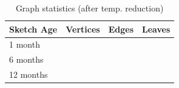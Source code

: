 \begin{table}[h!]
    \renewcommand{\arraystretch}{1.3}
    \caption{Graph statistics (after temp. reduction)}
    \label{tbl:graph-stats}
    \begin{center}
        \begin{tabular}{|l|c|c|c|}
            \hline
            Sketch Age & Vertices & Edges & Leaves \\
            \hline
            1 month & & & \\
            \hline
            6 months & & & \\
            \hline
            12 months & & & \\
            \hline
        \end{tabular}
    \end{center}
\end{table}


